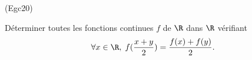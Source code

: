 \begin{tiny}(Egc20)\end{tiny} Déterminer toutes les fonctions continues $f$ de $\R$ dans $\R$ vérifiant
\[
 \forall x \in \R, \;
 f(\frac{x+y}{2}) = \frac{f(x) + f(y)}{2}.
\]


